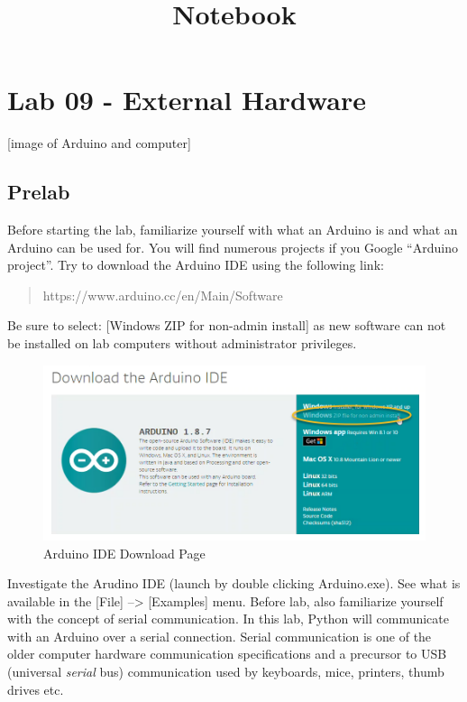 \documentclass[11pt]{article}
\title{Notebook}
\makeatletter
\def\maxwidth{\ifdim\Gin@nat@width>\linewidth\linewidth
    \else\Gin@nat@width\fi}
\let\Oldincludegraphics\includegraphics
\renewcommand{\includegraphics}[1]{\Oldincludegraphics[width=.8\maxwidth]{#1}}
\makeatother
\begin{document}
    
    
    

    
    

    
    \hypertarget{lab-09---external-hardware}{%
\section{Lab 09 - External Hardware}\label{lab-09---external-hardware}}

    {[}image of Arduino and computer{]}

    \hypertarget{prelab}{%
\subsection{Prelab}\label{prelab}}

Before starting the lab, familiarize yourself with what an Arduino is
and what an Arduino can be used for. You will find numerous projects if
you Google ``Arduino project''. Try to download the Arduino IDE using
the following link:

\begin{quote}
https://www.arduino.cc/en/Main/Software
\end{quote}

Be sure to select: {[}Windows ZIP for non-admin install{]} as new
software can not be installed on lab computers without administrator
privileges.

\begin{figure}
\centering
\includegraphics{images/arduino_download_page.png}
\caption{Arduino IDE Download Page}
\end{figure}

Investigate the Arudino IDE (launch by double clicking Arduino.exe). See
what is available in the {[}File{]} --\textgreater{} {[}Examples{]}
menu. Before lab, also familiarize yourself with the concept of serial
communication. In this lab, Python will communicate with an Arduino over
a serial connection. Serial communication is one of the older computer
hardware communication specifications and a precursor to USB (universal
\emph{serial} bus) communication used by keyboards, mice, printers,
thumb drives etc.
\end{document}
